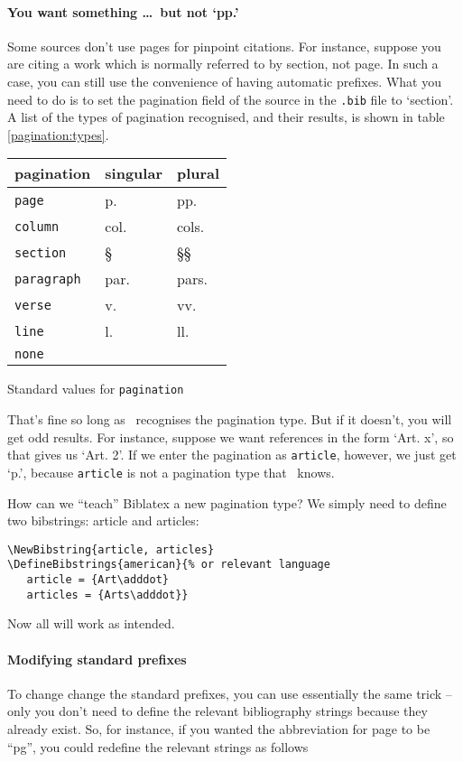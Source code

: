 \paragraph{You want something \ldots\ but not `pp.'} Some sources
don't use pages for pinpoint citations. For instance, suppose you
are citing a work which is normally referred to by section, not
page. In such a case, you can still use the convenience of having
automatic prefixes. What you need to do is to set the pagination field
of the source in the \texttt{.bib} file to `section'. A list of the
types of pagination recognised, and their results, is shown in table \ref{pagination:types}.
\begin{margintable}
\begin{tabular}{lll}
  \toprule
  \textsf{pagination} & \textsf{singular} & \textsf{plural} \\
  \midrule
  \texttt{page} & p. & pp. \\
  \texttt{column} & col. & cols. \\
  \texttt{section} & \S & \S\S \\
  \texttt{paragraph} & par. & pars. \\
  \texttt{verse} & v. & vv. \\
  \texttt{line} & l. & ll. \\
  \texttt{none} \\
  \bottomrule
\end{tabular}
\caption{Standard values for \texttt{pagination}\label{pagination:types}}
\end{margintable}


That’s fine so long as \biblatex\ recognises the pagination type. But if
it doesn’t, you will get odd results. For instance, suppose we want
references in the form `Art. x', so that  gives us
`Art. 2'. If we enter the pagination as \texttt{article}, however, we
just get `p.', because \texttt{article} is not a
pagination type that \biblatex\ knows.

How can we “teach” Biblatex a new pagination type? We simply need to
define two bibstrings: article and articles:

\begin{verbatim}
\NewBibstring{article, articles}
\DefineBibstrings{american}{% or relevant language
   article = {Art\adddot}
   articles = {Arts\adddot}}
\end{verbatim}
Now all will work as intended. 

\paragraph{Modifying standard prefixes} To change change the standard
prefixes, you can use essentially the same trick -- only you don't
need to define the relevant bibliography strings because they already exist. So, for instance, if you wanted the abbreviation for page
to be “pg”, you could redefine the relevant strings as follows

